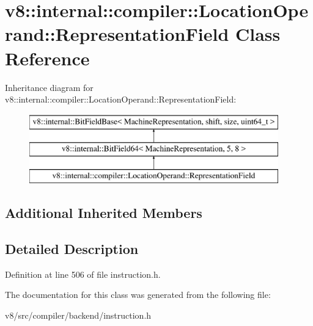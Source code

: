 \hypertarget{classv8_1_1internal_1_1compiler_1_1LocationOperand_1_1RepresentationField}{}\section{v8\+:\+:internal\+:\+:compiler\+:\+:Location\+Operand\+:\+:Representation\+Field Class Reference}
\label{classv8_1_1internal_1_1compiler_1_1LocationOperand_1_1RepresentationField}
Inheritance diagram for v8\+:\+:internal\+:\+:compiler\+:\+:Location\+Operand\+:\+:Representation\+Field\+:\begin{figure}[H]
\begin{center}
\leavevmode
\includegraphics[height=3.000000cm]{classv8_1_1internal_1_1compiler_1_1LocationOperand_1_1RepresentationField}
\end{center}
\end{figure}
\subsection*{Additional Inherited Members}


\subsection{Detailed Description}


Definition at line 506 of file instruction.\+h.



The documentation for this class was generated from the following file\+:\begin{DoxyCompactItemize}
\item 
v8/src/compiler/backend/instruction.\+h\end{DoxyCompactItemize}
